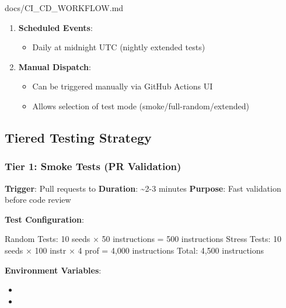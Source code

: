 \begin{relocated}{docs/CI_CD_WORKFLOW.md}
\begin{enumerate}
  \begin{itemize}
  \tightlist
  \item
    PRs targeting  branch
  \end{itemize}
\item
  \textbf{Scheduled Events}:

  \begin{itemize}
  \tightlist
  \item
    Daily at midnight UTC (nightly extended tests)
  \end{itemize}
\item
  \textbf{Manual Dispatch}:

  \begin{itemize}
  \tightlist
  \item
    Can be triggered manually via GitHub Actions UI
  \item
    Allows selection of test mode
    (smoke/\allowbreak{}full-random/\allowbreak{}extended)
  \end{itemize}
\end{enumerate}

\subsection{Tiered Testing Strategy}\label{um:flow:ci-cd-workflow:tiered-testing-strategy}

\subsubsection{Tier 1: Smoke Tests (PR Validation)}\label{um:flow:ci-cd-workflow:tier-1-smoke-tests-pr-validation}

\textbf{Trigger}: Pull requests to  \textbf{Duration}:
\textasciitilde2-3 minutes \textbf{Purpose}: Fast validation before code
review

\textbf{Test Configuration}:

\begin{textblock}
Random Tests:  10 seeds × 50 instructions     = 500 instructions
Stress Tests:  10 seeds × 100 instr × 4 prof  = 4,000 instructions
Total:                                          4,500 instructions
\end{textblock}

\textbf{Environment Variables}:

\begin{itemize}
\tightlist
\item
\item
\end{itemize}


\end{relocated}
